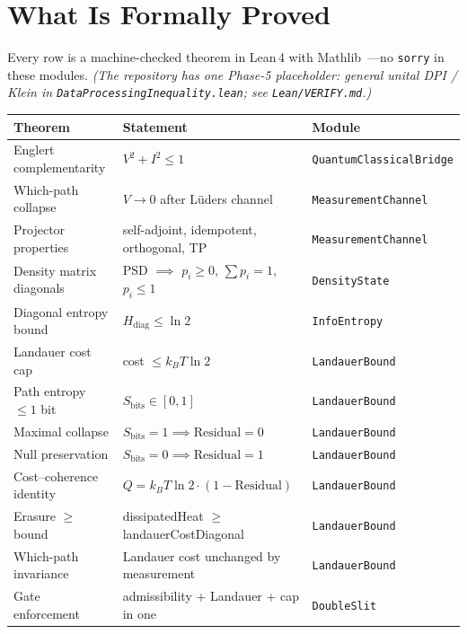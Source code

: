 \documentclass[10pt, a4paper]{article}
\begin{document}
\section{What Is Formally Proved}

\noindent Every row is a machine-checked theorem in Lean\,4 with Mathlib~\cite{lean4, mathlib2020}---no \texttt{sorry} in these modules. \emph{(The repository has one Phase-5 placeholder: general unital DPI / Klein in \texttt{DataProcessingInequality.lean}; see \texttt{Lean/VERIFY.md}.)}

\vspace{0.15em}
{\footnotesize
\begin{tabular}{@{}lll@{}}
\toprule
\textbf{Theorem} & \textbf{Statement} & \textbf{Module} \\
\midrule
Englert complementarity & $V^2 + I^2 \le 1$ & \texttt{QuantumClassicalBridge} \\
Which-path collapse & $V \to 0$ after L\"uders channel & \texttt{MeasurementChannel} \\
Projector properties & self-adjoint, idempotent, orthogonal, TP & \texttt{MeasurementChannel} \\
Density matrix diagonals & PSD $\implies$ $p_i \ge 0$, $\sum p_i = 1$, $p_i \le 1$ & \texttt{DensityState} \\
Diagonal entropy bound & $H_{\text{diag}} \le \ln 2$ & \texttt{InfoEntropy} \\
Landauer cost cap & cost $\le k_B T \ln 2$ & \texttt{LandauerBound} \\
Path entropy $\le 1$ bit & $S_{\text{bits}} \in [0, 1]$ & \texttt{LandauerBound} \\
Maximal collapse & $S_{\text{bits}} = 1 \implies \text{Residual} = 0$ & \texttt{LandauerBound} \\
Null preservation & $S_{\text{bits}} = 0 \implies \text{Residual} = 1$ & \texttt{LandauerBound} \\
Cost--coherence identity & $Q = k_B T \ln 2 \cdot (1 - \text{Residual})$ & \texttt{LandauerBound} \\
Erasure $\ge$ bound & dissipatedHeat $\ge$ landauerCostDiagonal & \texttt{LandauerBound} \\
Which-path invariance & Landauer cost unchanged by measurement & \texttt{LandauerBound} \\
Gate enforcement & admissibility + Landauer + cap in one & \texttt{DoubleSlit} \\
\bottomrule
\end{tabular}}
\end{document}

